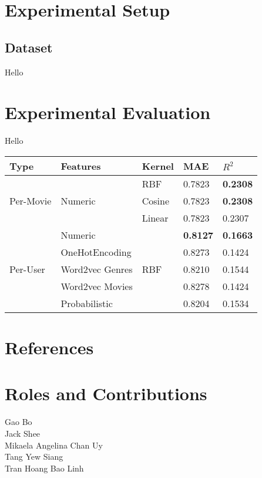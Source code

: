 \documentclass[a4paper]{article}
\theoremstyle{genius}
\begin{document}
\section{Experimental Setup}
\subsection{Dataset}
Hello

\section{Experimental Evaluation}
Hello 
\begin{center}
	\begin{tabular}{lllll}
		\hline
		Type & Features & Kernel & MAE & $R^{2}$ \\
		\hline
		\multirow{3}{*}{Per-Movie} &\multirow{3}{*}{Numeric}
		 & RBF & 0.7823 & \textbf{0.2308}\\
		& & Cosine & 0.7823 & \textbf{0.2308} \\
		& & Linear & 0.7823 & 0.2307 \\
		\hline
		\multirow{5}{*}{Per-User} & Numeric & \multirow{5}{*}{RBF} & \textbf{0.8127} & \textbf{0.1663} \\
		& OneHotEncoding & & 0.8273 & 0.1424 \\
		& Word2vec Genres & & 0.8210 & 0.1544 \\
		& Word2vec Movies & & 0.8278 & 0.1424 \\
		& Probabilistic   & & 0.8204 & 0.1534\\
		\hline
	\end{tabular}
\end{center}

\section{References}


\section{Roles and Contributions}

\begin{description}
\item [Gao Bo]
\item [Jack Shee]
\item [Mikaela Angelina Chan Uy] 
\item [Tang Yew Siang]
\item [Tran Hoang Bao Linh]
\end{description}
\end{document}
